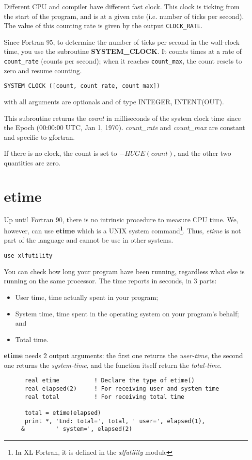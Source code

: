 Different CPU and compiler have different fast clock. This clock is
ticking from the start of the program, and is at a given rate
(i.e. number of ticks per second). The value of this counting rate is
given by the output \verb!CLOCK_RATE!.


Since Fortran 95, to determine the number of ticks per second in the
wall-clock time, you use the subroutine {\bf SYSTEM\_CLOCK}. It counts
times at a rate of \verb!count_rate! (counts per second); when it
reaches \verb!count_max!, the count resets to zero and resume
counting. 
\begin{lstlisting}
SYSTEM_CLOCK ([count, count_rate, count_max])
\end{lstlisting}
with all arguments are optionals and of type  INTEGER, INTENT(OUT).

This subroutine returns the {\it count} in milliseconds of the system
clock time since the Epoch (00:00:00 UTC, Jan 1, 1970). {\it
  count\_rate} and {\it count\_max} are constant and specific to
gfortran.

If there is no clock, the count is set to $-HUGE(count)$, and the
other two quantities are zero.



\section{etime}
\label{sec:etime}

Up until Fortran 90, there is no intrinsic procedure to measure CPU
time. We, however, can use {\bf etime} which is a UNIX system
command\footnote{In XL-Fortran, it is defined in the {\it xlfutility}
  module}.
Thus, {\it etime} is not part of the language and cannot be use in
other systems.

\begin{lstlisting}
use xlfutility
\end{lstlisting}
You can check how long your program have been running, regardless what
else is running on the same processor. The time reports in seconds, in
3 parts:
\begin{itemize}
\item  User time, time actually spent in your program;
\item  System time, time spent in the operating system on your
  program's behalf; and
\item  Total time. 
\end{itemize}

{\bf etime} needs 2 output arguments: the first one returns the {\it
  user-time}, the second one returns the {\it system-time}, and the
function itself return the {\it total-time}.
\begin{lstlisting}
      real etime          ! Declare the type of etime()
      real elapsed(2)     ! For receiving user and system time
      real total          ! For receiving total time

      total = etime(elapsed)
      print *, 'End: total=', total, ' user=', elapsed(1),
     &         ' system=', elapsed(2)
\end{lstlisting}

